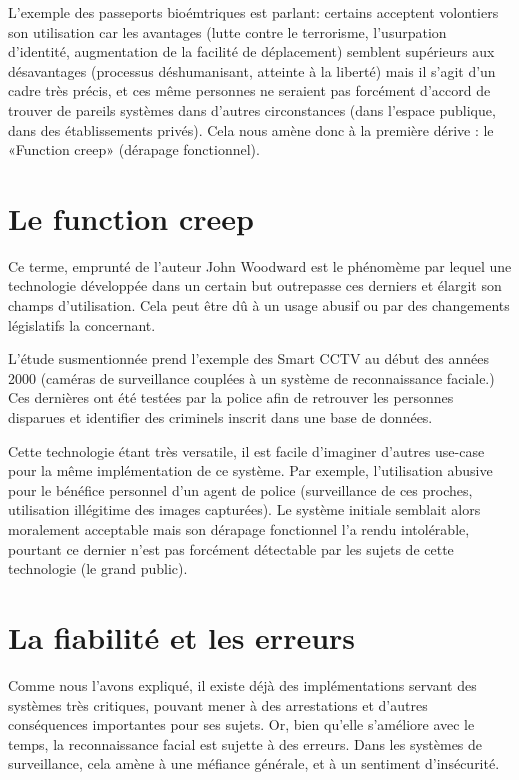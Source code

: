 L’exemple des passeports bioémtriques est parlant: certains acceptent volontiers son utilisation car les avantages
(lutte contre le terrorisme, l’usurpation d’identité, augmentation de la facilité de déplacement) semblent
supérieurs aux désavantages (processus déshumanisant, atteinte à la liberté) mais il s’agit d’un cadre très précis, et
ces même personnes ne seraient pas forcément d’accord de trouver de pareils systèmes dans d’autres
circonstances (dans l’espace publique, dans des établissements privés). Cela nous amène donc à la première dérive
: le «Function creep» (dérapage fonctionnel).

\section{Le function creep}
Ce terme, emprunté de l’auteur John Woodward est le phénomème par lequel une technologie développée dans
un certain but outrepasse ces derniers et élargit son champs d’utilisation. Cela peut être dû à un usage abusif ou
par des changements législatifs la concernant.

L’étude susmentionnée prend l’exemple des Smart CCTV au début des années 2000 (caméras de surveillance
couplées à un système de reconnaissance faciale.) Ces dernières ont été testées par la police afin de retrouver les
personnes disparues et identifier des criminels inscrit dans une base de données.

Cette technologie étant très versatile, il est facile d’imaginer d’autres use-case pour la même implémentation de
ce système. Par exemple, l’utilisation abusive pour le bénéfice personnel d’un agent de police (surveillance de ces
proches, utilisation illégitime des images capturées). Le système initiale semblait alors moralement acceptable mais
son dérapage fonctionnel l’a rendu intolérable, pourtant ce dernier n’est pas forcément détectable par les sujets
de cette technologie (le grand public).

\section{La fiabilité et les erreurs}
Comme nous l’avons expliqué, il existe déjà des implémentations servant des systèmes très critiques, pouvant
mener à des arrestations et d’autres conséquences importantes pour ses sujets. Or, bien qu’elle s’améliore avec le temps, la reconnaissance facial est sujette à des erreurs. Dans les systèmes de surveillance, cela amène à une
méfiance générale, et à un sentiment d’insécurité. 

